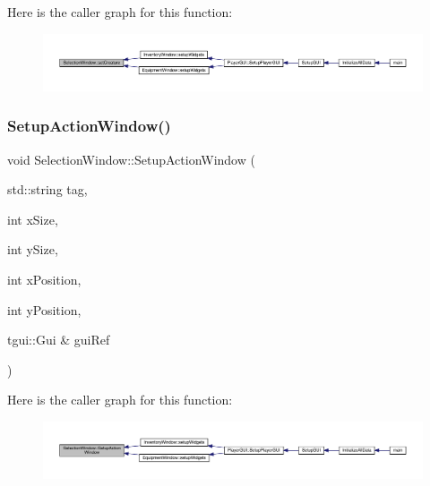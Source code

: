 Here is the caller graph for this function\+:
\nopagebreak
\begin{figure}[H]
\begin{center}
\leavevmode
\includegraphics[width=350pt]{db/d9c/class_selection_window_a870a261488489d8407da1cfacefa2724_icgraph}
\end{center}
\end{figure}
\mbox{\label{class_selection_window_a091bd686d352a2cf1236aa56a2e70174}} 
\subsubsection{\texorpdfstring{Setup\+Action\+Window()}{SetupActionWindow()}}
{\footnotesize\ttfamily void Selection\+Window\+::\+Setup\+Action\+Window (\begin{DoxyParamCaption}\item[{std\+::string}]{tag,  }\item[{int}]{x\+Size,  }\item[{int}]{y\+Size,  }\item[{int}]{x\+Position,  }\item[{int}]{y\+Position,  }\item[{tgui\+::\+Gui \&}]{gui\+Ref }\end{DoxyParamCaption})}

Here is the caller graph for this function\+:
\nopagebreak
\begin{figure}[H]
\begin{center}
\leavevmode
\includegraphics[width=350pt]{db/d9c/class_selection_window_a091bd686d352a2cf1236aa56a2e70174_icgraph}
\end{center}
\end{figure}
\mbox{\label{class_selection_window_a364adfebc05e660c153d58117762ed97}} 
